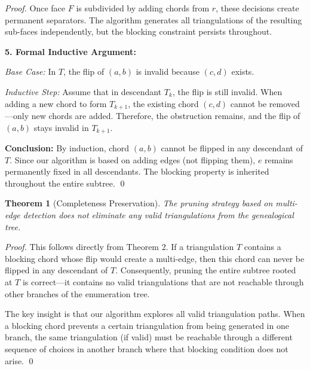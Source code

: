 \documentclass[12pt,a4paper]{article}
\newtheorem{theorem}{Theorem}
\begin{document}
\begin{proof}
Once face $F$ is subdivided by adding chords from $r$, these decisions create permanent separators. The algorithm generates all triangulations of the resulting sub-faces independently, but the blocking constraint persists throughout.

\textbf{5. Formal Inductive Argument:}

\textit{Base Case:} In $T$, the flip of $(a,b)$ is invalid because $(c,d)$ exists.

\textit{Inductive Step:} Assume that in descendant $T_k$, the flip is still invalid. When adding a new chord to form $T_{k+1}$, the existing chord $(c,d)$ cannot be removed---only new chords are added. Therefore, the obstruction remains, and the flip of $(a,b)$ stays invalid in $T_{k+1}$.

\textbf{Conclusion:} By induction, chord $(a,b)$ cannot be flipped in any descendant of $T$. Since our algorithm is based on adding edges (not flipping them), $e$ remains permanently fixed in all descendants. The blocking property is inherited throughout the entire subtree. \qed
\end{proof}

\begin{theorem}[Completeness Preservation]
The pruning strategy based on multi-edge detection does not eliminate any valid triangulations from the genealogical tree.
\end{theorem}

\begin{proof}
This follows directly from Theorem 2. If a triangulation $T$ contains a blocking chord whose flip would create a multi-edge, then this chord can never be flipped in any descendant of $T$. Consequently, pruning the entire subtree rooted at $T$ is correct---it contains no valid triangulations that are not reachable through other branches of the enumeration tree.

The key insight is that our algorithm explores all valid triangulation paths. When a blocking chord prevents a certain triangulation from being generated in one branch, the same triangulation (if valid) must be reachable through a different sequence of choices in another branch where that blocking condition does not arise. \qed
\end{proof}
\end{document}
